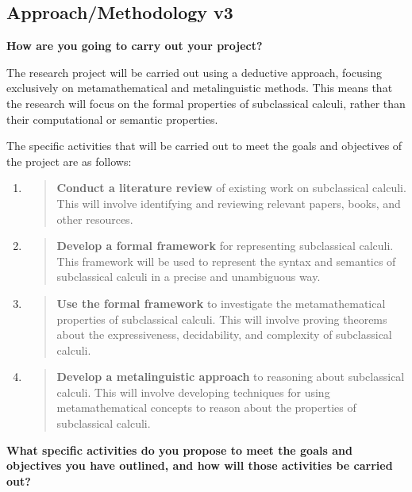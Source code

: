 \hypertarget{approachmethodology-v3}{%
\subsection{Approach/Methodology v3}\label{approachmethodology-v3}}

\textbf{How are you going to carry out your project?}

The research project will be carried out using a deductive approach,
focusing exclusively on metamathematical and metalinguistic methods.
This means that the research will focus on the formal properties of
subclassical calculi, rather than their computational or semantic
properties.

The specific activities that will be carried out to meet the goals and
objectives of the project are as follows:

\begin{enumerate}
\def\labelenumi{\arabic{enumi}.}
\item
  \begin{quote}
  \textbf{Conduct a literature review} of existing work on subclassical
  calculi. This will involve identifying and reviewing relevant papers,
  books, and other resources.
  \end{quote}
\item
  \begin{quote}
  \textbf{Develop a formal framework} for representing subclassical
  calculi. This framework will be used to represent the syntax and
  semantics of subclassical calculi in a precise and unambiguous way.
  \end{quote}
\item
  \begin{quote}
  \textbf{Use the formal framework} to investigate the metamathematical
  properties of subclassical calculi. This will involve proving theorems
  about the expressiveness, decidability, and complexity of subclassical
  calculi.
  \end{quote}
\item
  \begin{quote}
  \textbf{Develop a metalinguistic approach} to reasoning about
  subclassical calculi. This will involve developing techniques for
  using metamathematical concepts to reason about the properties of
  subclassical calculi.
  \end{quote}
\end{enumerate}

\textbf{What specific activities do you propose to meet the goals and
objectives you have outlined, and how will those activities be carried
out?}

